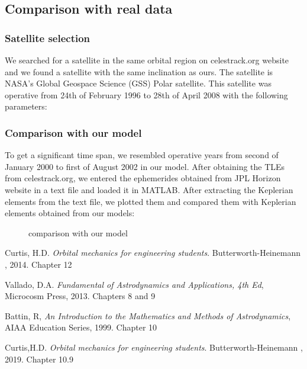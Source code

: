 \documentclass[11pt,a4paper]{report}
\begin{document}
\subsection{Comparison with real data}

\subsubsection{Satellite selection}
We searched for a satellite in the same orbital region on celestrack.org website and we found a satellite with the same inclination as ours. 
The satellite is NASA’s Global Geospace Science (GSS) Polar satellite.
This satellite was operative from 24th of February 1996 to 28th of April 2008 with the following parameters:


\begin{table}[H]
\centering
{}
\end{table}
\subsubsection{Comparison with our model}

To get a significant time span, we resembled operative years from second of January 2000 to first of August 2002 in our model. After obtaining the TLEs from celestrack.org, we entered the ephemerides obtained from JPL Horizon website in a text file and loaded it in MATLAB. After extracting the Keplerian elements from the text file, we plotted them  and compared them with Keplerian elements obtained from our models: 

\begin{figure}[H]
\centering
\caption{comparison with our model}
\end{figure}

\begin{thebibliography}{9}
Curtis, H.D. 
\textit{Orbital mechanics for engineering students}. 
Butterworth-Heinemann , 2014. Chapter 12

Vallado, D.A.
\textit{Fundamental of Astrodynamics and Applications, 4th
Ed}, Microcosm Press, 2013. Chapters 8 and 9

Battin, R,
\textit{An Introduction to the Mathematics and Methods of
Astrodynamics}, AIAA Education Series, 1999. Chapter 10

Curtis,H.D. 
\textit{Orbital mechanics for engineering students}. 
Butterworth-Heinemann , 2019. Chapter 10.9

\end{thebibliography}
\end{document}
